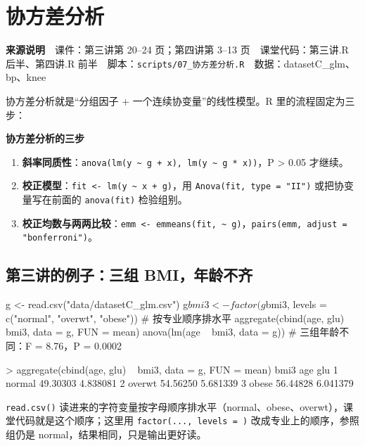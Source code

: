 \chapter{协方差分析}

\begin{studysource}
\textbf{来源说明}　课件：第三讲第 20–24 页；第四讲第 3–13 页　课堂代码：第三讲.R 后半、第四讲.R 前半　脚本：\texttt{scripts/07\_协方差分析.R}　数据：datasetC\_glm、bp、knee
\end{studysource}


协方差分析就是“分组因子 + 一个连续协变量”的线性模型。R 里的流程固定为三步：


\begin{studyreview}
\textbf{协方差分析的三步}


\begin{enumerate}
\item \textbf{斜率同质性}：\Verb|anova(lm(y ~ g + x), lm(y ~ g * x))|，P > 0.05 才继续。
\item \textbf{校正模型}：\Verb|fit <- lm(y ~ x + g)|，用 \Verb|Anova(fit, type = "II")| 或把协变量写在前面的 \Verb|anova(fit)| 检验组别。
\item \textbf{校正均数与两两比较}：\Verb|emm <- emmeans(fit, ~ g)|，\Verb|pairs(emm, adjust = "bonferroni")|。
\end{enumerate}

\end{studyreview}


\section{第三讲的例子：三组 BMI，年龄不齐}
\label{sec:ancova-c}
\begin{rcode}[R · 为什么要校正]
g <- read.csv("data/datasetC_glm.csv")
g$bmi3 <- factor(g$bmi3, levels = c("normal", "overwt", "obese"))   # 按专业顺序排水平
aggregate(cbind(age, glu) ~ bmi3, data = g, FUN = mean)
anova(lm(age ~ bmi3, data = g))            # 三组年龄不同：F = 8.76，P = 0.0002
\end{rcode}
\begin{routput}
> aggregate(cbind(age, glu) ~ bmi3, data = g, FUN = mean)
    bmi3      age      glu
1 normal 49.30303 4.838081
2 overwt 54.56250 5.681339
3  obese 56.44828 6.041379
\end{routput}
\Verb|read.csv()| 读进来的字符变量按字母顺序排水平（normal、obese、overwt），课堂代码就是这个顺序；这里用 \Verb|factor(..., levels = )| 改成专业上的顺序，参照组仍是 normal，结果相同，只是输出更好读。


